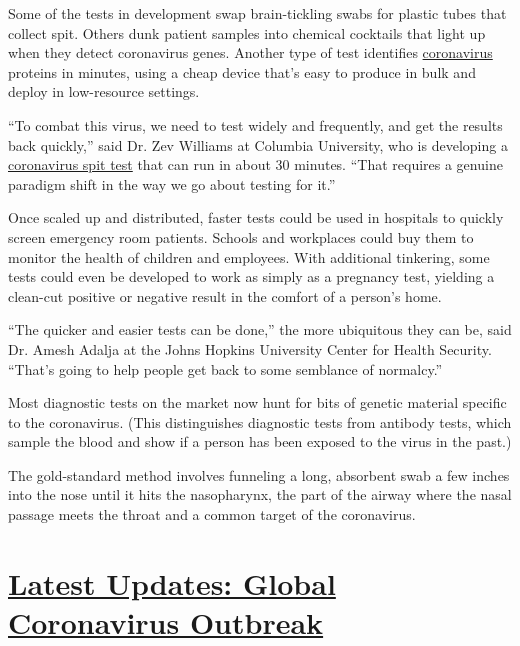 Some of the tests in development swap brain-tickling swabs for plastic
tubes that collect spit. Others dunk patient samples into chemical
cocktails that light up when they detect coronavirus genes. Another type
of test identifies
\href{https://www.nytimes3xbfgragh.onion/2020/07/15/parenting/kids-covid-19-test.html}{coronavirus}
proteins in minutes, using a cheap device that's easy to produce in bulk
and deploy in low-resource settings.

``To combat this virus, we need to test widely and frequently, and get
the results back quickly,'' said Dr. Zev Williams at Columbia
University, who is developing a
\href{https://www.medrxiv.org/content/10.1101/2020.06.13.20129841v1.full.pdf}{coronavirus
spit test} that can run in about 30 minutes. ``That requires a genuine
paradigm shift in the way we go about testing for it.''

Once scaled up and distributed, faster tests could be used in hospitals
to quickly screen emergency room patients. Schools and workplaces could
buy them to monitor the health of children and employees. With
additional tinkering, some tests could even be developed to work as
simply as a pregnancy test, yielding a clean-cut positive or negative
result in the comfort of a person's home.

``The quicker and easier tests can be done,'' the more ubiquitous they
can be, said Dr. Amesh Adalja at the Johns Hopkins University Center for
Health Security. ``That's going to help people get back to some
semblance of normalcy.''

Most diagnostic tests on the market now hunt for bits of genetic
material specific to the coronavirus. (This distinguishes diagnostic
tests from antibody tests, which sample the blood and show if a person
has been exposed to the virus in the past.)

The gold-standard method involves funneling a long, absorbent swab a few
inches into the nose until it hits the nasopharynx, the part of the
airway where the nasal passage meets the throat and a common target of
the coronavirus.

\hypertarget{latest-updates-global-coronavirus-outbreak}{%
\section{\texorpdfstring{\href{https://www.nytimes3xbfgragh.onion/2020/08/04/world/coronavirus-cases.html?action=click\&pgtype=Article\&state=default\&region=MAIN_CONTENT_1\&context=storylines_live_updates}{Latest
Updates: Global Coronavirus
Outbreak}}{Latest Updates: Global Coronavirus Outbreak}}\label{latest-updates-global-coronavirus-outbreak}}

